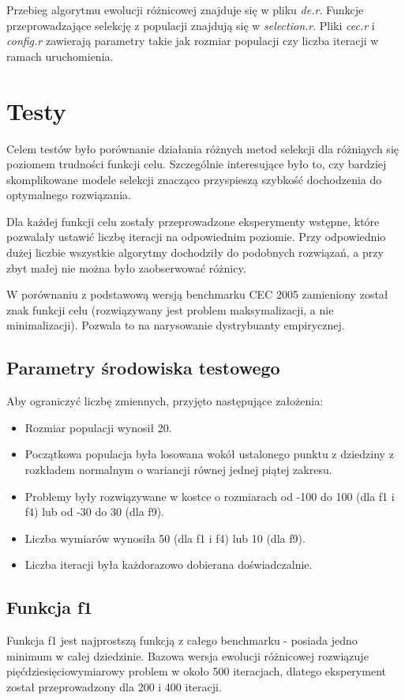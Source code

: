 \documentclass[11pt]{article}
\begin{document}
Przebieg algorytmu ewolucji różnicowej znajduje się w pliku \emph{de.r}.
Funkcje przeprowadzające selekcję z populacji znajdują się w \emph{selection.r}.
Pliki \emph{cec.r} i \emph{config.r} zawierają parametry takie jak rozmiar populacji czy liczba iteracji w ramach uruchomienia.

\section{Testy}
Celem testów było porównanie działania różnych metod selekcji dla różniąych się poziomem trudności funkcji celu.
Szczególnie interesujące było to, czy bardziej skomplikowane modele selekcji znacząco przyspieszą szybkość dochodzenia do optymalnego rozwiązania.

Dla każdej funkcji celu zostały przeprowadzone eksperymenty wstępne, które pozwalały ustawić liczbę iteracji na odpowiednim poziomie.
Przy odpowiednio dużej liczbie wszystkie algorytmy dochodziły do podobnych rozwiązań, a przy zbyt małej nie można było zaobserwować różnicy.

W porównaniu z podstawową wersją benchmarku CEC 2005 zamieniony został znak funkcji celu (rozwiązywany jest problem maksymalizacji, a nie minimalizacji).
Pozwala to na narysowanie dystrybuanty empirycznej.

\subsection{Parametry środowiska testowego}
Aby ograniczyć liczbę zmiennych, przyjęto następujące założenia:
\begin{itemize}
 \item Rozmiar populacji wynosił 20.
 \item Początkowa populacja była losowana wokół ustalonego punktu z dziedziny z rozkładem normalnym o wariancji równej jednej piątej zakresu.
 \item Problemy były rozwiązywane w kostce o rozmiarach od -100 do 100 (dla f1 i f4) lub od -30 do 30 (dla f9).
 \item Liczba wymiarów wynosiła 50 (dla f1 i f4) lub 10 (dla f9).
 \item Liczba iteracji była każdorazowo dobierana doświadczalnie.
\end{itemize}

\subsection{Funkcja f1}
Funkcja f1 jest najprostszą funkcją z całego benchmarku - posiada jedno minimum w całej dziedzinie.
Bazowa wersja ewolucji różnicowej rozwiązuje pięćdziesięciowymiarowy problem w około 500 iteracjach, dlatego eksperyment został przeprowadzony dla 200 i 400 iteracji.
\end{document}
